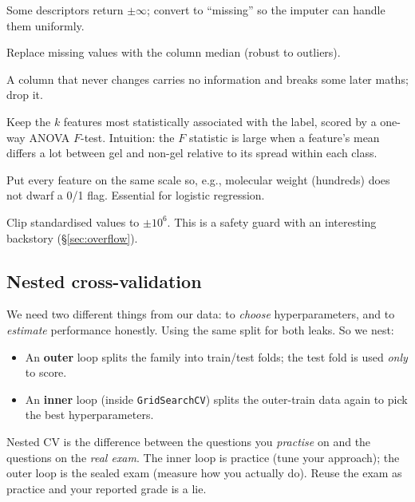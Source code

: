 \documentclass[11pt]{article}
\newenvironment{callout}[2][blue]{%
  \par\smallskip\colorlet{shadecolor}{#1!7}%
  \begin{shaded}\noindent{\color{#1!55!black}\bfseries #2.\ }\ignorespaces}%
  {\end{shaded}\smallskip}
\newcommand{\code}[1]{\texttt{#1}}
\begin{document}
\begin{description}[leftmargin=1.6em,style=nextline]
  \item[CleanInf] Some descriptors return $\pm\infty$; convert to ``missing'' so
    the imputer can handle them uniformly.
  \item[SimpleImputer(median)] Replace missing values with the column median
    (robust to outliers).
  \item[VarianceThreshold] A column that never changes carries no information and
    breaks some later maths; drop it.
  \item[SelectKBest($f\_classif$)] Keep the $k$ features most statistically
    associated with the label, scored by a one-way ANOVA $F$-test. Intuition: the
    $F$ statistic is large when a feature's mean differs a lot between gel and
    non-gel relative to its spread within each class.
  \item[StandardScaler] Put every feature on the same scale so, e.g., molecular
    weight (hundreds) does not dwarf a 0/1 flag. Essential for logistic regression.
  \item[Winsorize] Clip standardised values to $\pm 10^6$. This is a safety guard
    with an interesting backstory (\S\ref{sec:overflow}).
\end{description}

\subsection{Nested cross-validation}
We need two different things from our data: to \emph{choose} hyperparameters, and
to \emph{estimate} performance honestly. Using the same split for both leaks. So
we nest:
\begin{itemize}[leftmargin=1.6em]
  \item An \textbf{outer} loop splits the family into train/test folds; the test
    fold is used \emph{only} to score.
  \item An \textbf{inner} loop (inside \code{GridSearchCV}) splits the outer-train
    data again to pick the best hyperparameters.
\end{itemize}

\begin{callout}[violet]{Analogy}
Nested CV is the difference between the questions you \emph{practise} on and the
questions on the \emph{real exam}. The inner loop is practice (tune your
approach); the outer loop is the sealed exam (measure how you actually do). Reuse
the exam as practice and your reported grade is a lie.
\end{callout}
\end{document}
